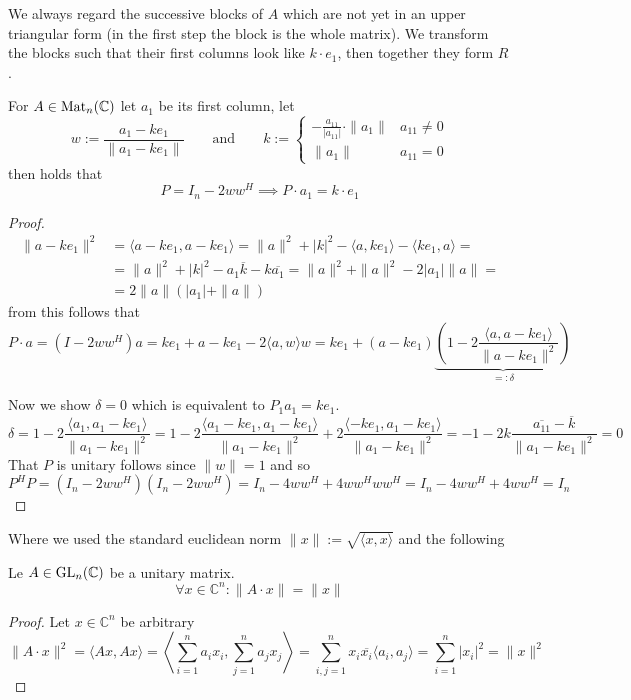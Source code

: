 We always regard the successive blocks of \(A\) which are not yet in an upper triangular form (in the first step the block is the whole matrix).
We transform the blocks such that their first columns look like \(k \cdot e_1\), then together they form \(R\).

\begin{lemma}\label{lem:qr_permut_mat}
   For \(A \in \operatorname{Mat}_n(\mathbb{C})\) let \(a_1\) be its first column, let
   \[w := \frac{a_1 - ke_1}{\|a_1 - ke_1\|} \qquad\text{and}\qquad k := \begin{cases} -\frac{a_{11}}{|a_{11}|} \cdot \|a_1\| & a_{11} \neq 0\\ \|a_1\| & a_{11} = 0\end{cases}\]
   then holds that
   \[P = I_n - 2 ww^H  \implies P \cdot a_1 = k \cdot e_1\]
\end{lemma}
\begin{proof}
   \begin{equation*}
      \begin{split}
         \|a - ke_1\|^2 & = \langle a - ke_1, a - ke_1\rangle = \|a\|^2 + |k|^2 - \langle a, ke_1\rangle - \langle ke_1, a\rangle = \\
                          & = \|a\|^2 + |k|^2 - a_1\overline{k} - k\overline{a_1} = \|a\|^2 + \|a\|^2 - 2|a_1|\|a\| = \\
                          & = 2 \|a\|(|a_1| + \|a\|)
      \end{split}
   \end{equation*}
   from this follows that
   \[P \cdot a = (I - 2ww^H)a = ke_1 + a - ke_1 - 2 \langle a, w\rangle w = ke_1 + (a - ke_1)\underbrace{\left(1 - 2\frac{\langle a, a - ke_1\rangle}{\|a - ke_1\|^2}\right)}_{=: \delta}\]

   Now we show \(\delta = 0\) which is equivalent to \(P_1a_1 = ke_1\).
   \[\delta = 1 - 2\frac{\langle a_1, a_1 - ke_1\rangle}{\|a_1 - ke_1\|^2} = 1 - 2\frac{\langle a_1 - ke_1, a_1 - ke_1\rangle}{\|a_1 - ke_1\|^2} + 2\frac{\langle -ke_1, a_1 - ke_1\rangle}{\|a_1 - ke_1\|^2} = -1 - 2k\frac{\overline{a_{11}} - \overline{k}}{\|a_1 - ke_1\|^2} = 0\]
   That \(P\) is unitary follows since \(\|w\| = 1\) and so
   \[P^H P = (I_n - 2ww^H)(I_n - 2ww^H) = I_n - 4ww^H + 4ww^Hww^H = I_n - 4ww^H + 4ww^H = I_n\]
\end{proof}

Where we used the standard euclidean norm \(\|x\| := \sqrt{\langle x, x \rangle}\) and the following
\begin{proposition}
   Le \(A \in \operatorname{GL}_n(\mathbb{C})\) be a unitary matrix.
   \[\forall x \in \mathbb{C}^n: \|A \cdot x\| = \|x\|\]
\end{proposition}
\begin{proof}
   Let \(x \in \mathbb{C}^n\) be arbitrary
   \[\|A \cdot x\|^2 = \langle Ax, Ax \rangle = \left\langle \sum_{i=1}^n a_i x_i, \sum_{j=1}^n a_j x_j \right\rangle = \sum_{i,j=1}^n x_i \overline{x_i} \langle a_i, a_j \rangle = \sum_{i=1}^n |x_i|^2 = \|x\|^2\]
\end{proof}

